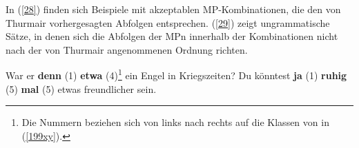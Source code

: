 \noindent	
In (\ref{28}) finden sich Beispiele mit akzeptablen MP-Kombinationen, die den von Thurmair vorhergesagten Abfolgen entsprechen. (\ref{29}) zeigt ungrammatische Sätze, in denen sich die Abfolgen der MPn innerhalb der Kombinationen nicht nach der von Thurmair angenommenen Ordnung richten.

\begin{exe}
	\ex\label{28} 
		\begin{xlist}	
			\ex\label{28a} War er \textbf{denn} (1) \textbf{etwa} (4)\footnote{Die Nummern beziehen sich von links nach rechts auf die Klassen von \citet{Thurmair1991} in (\ref{199xy}).} ein Engel in Kriegszeiten?
			\ex\label{28b} Du könntest \textbf{ja} (1) \textbf{ruhig} (5) \textbf{mal} (5) etwas freundlicher sein.
		\end{xlist}
\end{exe}

